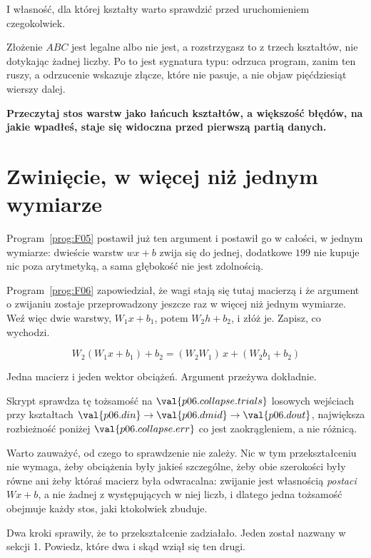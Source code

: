 \begin{fr}
I własność, dla której kształty warto sprawdzić przed uruchomieniem
czegokolwiek.

Złożenie $ABC$ jest legalne albo nie jest, a rozstrzygasz to z trzech
kształtów, nie dotykając żadnej liczby. Po to jest sygnatura typu: odrzuca
program, zanim ten ruszy, a odrzucenie wskazuje złącze, które nie pasuje, a nie
objaw pięćdziesiąt wierszy dalej.

\textbf{Przeczytaj stos warstw jako łańcuch kształtów, a większość błędów, na
jakie wpadłeś, staje się widoczna przed pierwszą partią danych.}
\end{fr}

\section{Zwinięcie, w więcej niż jednym wymiarze}
\label{sec:P06-collapse}

\begin{fr}
Program~\ref{prog:F05} postawił już ten argument i postawił go w całości, w
jednym wymiarze: dwieście warstw $w x + b$ zwija się do jednej, dodatkowe
$199$ nie kupuje nic poza arytmetyką, a sama głębokość nie jest zdolnością.

Program~\ref{prog:F06} zapowiedział, że wagi stają się tutaj macierzą i że
argument o zwijaniu zostaje przeprowadzony jeszcze raz w więcej niż jednym
wymiarze. Weź więc dwie warstwy, $W_1 x + b_1$, potem
$W_2 h + b_2$, i złóż je. Zapisz, co wychodzi.
\dotline
\nextframe
\end{fr}

\begin{fr}
\begin{ansblock}
\[ W_2(W_1x + b_1) + b_2 = (W_2W_1)\,x + (W_2b_1 + b_2) \]
\end{ansblock}

Jedna macierz i jeden wektor obciążeń. Argument przeżywa dokładnie.

Skrypt sprawdza tę tożsamość na $\val{p06.collapse.trials}$ losowych wejściach
przy kształtach $\val{p06.din} \to \val{p06.dmid} \to \val{p06.dout}$,
największa rozbieżność poniżej $\val{p06.collapse.err}$ \dash{} co jest
zaokrągleniem, a nie różnicą.

Warto zauważyć, od czego to sprawdzenie nie zależy. Nic w tym przekształceniu
nie wymaga, żeby obciążenia były jakieś szczególne, żeby obie szerokości były
równe ani żeby któraś macierz była odwracalna: zwijanie jest własnością
\emph{postaci} $Wx + b$, a nie żadnej z występujących w niej liczb, i dlatego
jedna tożsamość obejmuje każdy stos, jaki ktokolwiek zbuduje.

Dwa kroki sprawiły, że to przekształcenie zadziałało. Jeden został nazwany w
sekcji 1. Powiedz, które dwa i skąd wziął się ten drugi.
\dotline
\nextframe
\end{fr}

